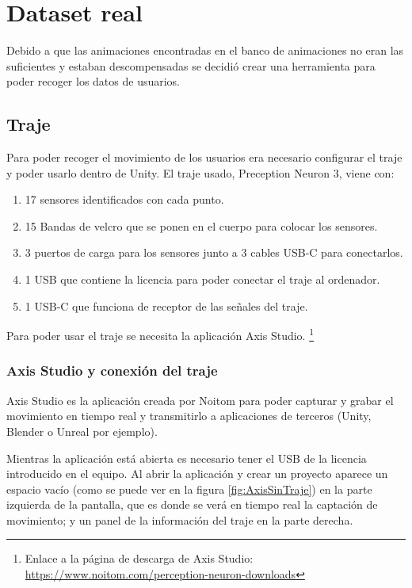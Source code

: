 \section{Dataset real}
\label{sec:datasetReal}
Debido a que las animaciones encontradas en el banco de animaciones no eran las suficientes y estaban descompensadas se decidió crear una herramienta para poder recoger los datos de usuarios.

\subsection{Traje}
\label{sec:traje}

Para poder recoger el movimiento de los usuarios era necesario configurar el traje y poder usarlo dentro de Unity.
El traje usado, Preception Neuron 3, viene con:

\begin{enumerate}
	\renewcommand{\theenumi}{\alph{enumi}}
	\item 17 sensores identificados con cada punto.
	\item 15 Bandas de velcro que se ponen en el cuerpo para colocar los sensores.
	\item 3 puertos de carga para los sensores junto a 3 cables USB-C para conectarlos.
	\item 1 USB que contiene la licencia para poder conectar el traje al ordenador.
	\item 1 USB-C que funciona de receptor de las señales del traje.
\end{enumerate}

Para poder usar el traje se necesita la aplicación Axis Studio. \footnote{Enlace a la página de descarga de Axis Studio: \url{https://www.noitom.com/perception-neuron-downloads}}
\subsubsection{Axis Studio y conexión del traje}
Axis Studio es la aplicación creada por Noitom para poder capturar y grabar el movimiento en tiempo real y transmitirlo a aplicaciones de terceros (Unity, Blender o Unreal por ejemplo).

Mientras la aplicación está abierta es necesario tener el USB de la licencia introducido en el equipo.
Al abrir la aplicación y crear un proyecto aparece un espacio vacío (como se puede ver en la figura \ref{fig:AxisSinTraje}) en la parte izquierda de la pantalla, que es donde se verá en tiempo real la captación de movimiento; y un panel de la información del traje en la parte derecha.

